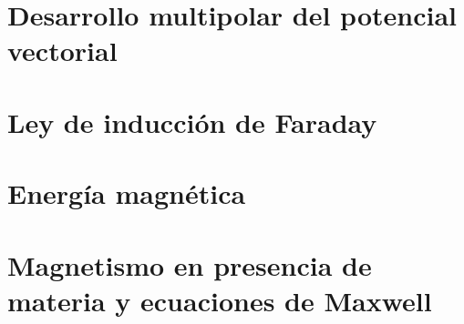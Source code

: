 \documentclass[11pt]{report}
\theoremstyle{plain}
\theoremstyle{definition}
\begin{document}
\chapter{Desarrollo multipolar del potencial vectorial}


\chapter{Ley de inducción de Faraday}


\chapter{Energía magnética}


\chapter{Magnetismo en presencia de materia y ecuaciones de Maxwell}

\end{document}
